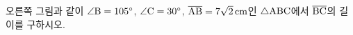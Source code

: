 \noindent\begin{minipage}[t]{0.58\linewidth}\vspace{0pt}\raggedright 오른쪽 그림과 같이 $\angle\mathrm{B}=105^\circ$, $\angle\mathrm{C}=30^\circ$, $\overline{\mathrm{AB}}=7\sqrt{2}\,\mathrm{cm}$인 $\triangle\mathrm{ABC}$에서 $\overline{\mathrm{BC}}$의 길이를 구하시오.\end{minipage}\hfill\begin{minipage}[t]{0.4\linewidth}\vspace{0pt}\centering \resizebox{\ifdim\width>\linewidth\linewidth\else\width\fi}{!}{}\end{minipage}\par
